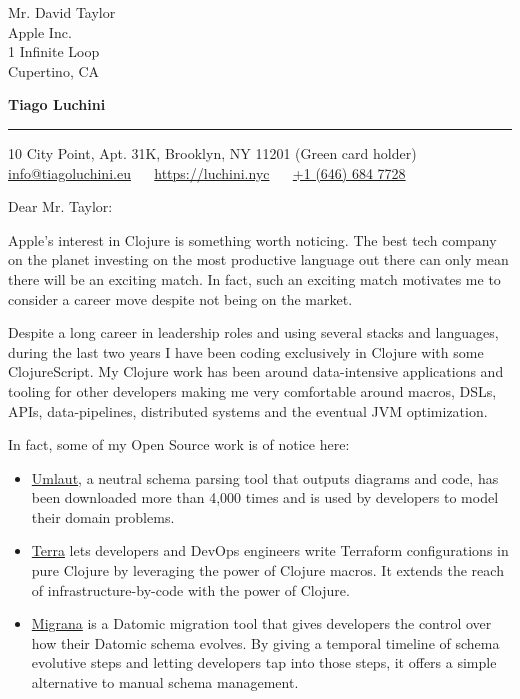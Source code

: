 \documentclass{letter} %
\begin{document}
\signature{Tiago Luchini}                  %
\longindentation=0pt                       %
\let\raggedleft\raggedright                %
 
 
\begin{letter}{Mr. David Taylor \\
Apple Inc. \\
1 Infinite Loop \\
Cupertino, CA}


\begin{flushleft}
{\large\bf Tiago Luchini}
\end{flushleft}
\medskip\hrule
\begin{flushright}
\hfill 10 City Point, Apt. 31K, Brooklyn, NY 11201 (Green card holder)\\ \hfill
\href{mailto:info@tiagoluchini.eu}{info@tiagoluchini.eu} ~~
\href{https://luchini.nyc}{https://luchini.nyc} ~~ \href{tel:+16466847728}{+1
  (646) 684 7728}
\end{flushright}
\vfill %
 
\opening{Dear Mr. Taylor:}


\noindent Apple's interest in Clojure is something worth noticing. The best tech
company on the planet investing on the most productive language out there can
only mean there will be an exciting match. In fact, such an exciting match
motivates me to consider a career move despite not being on the market.

\noindent Despite a long career in leadership roles and using several stacks and
languages, during the last two years I have been coding exclusively in Clojure
with some ClojureScript. My Clojure work has been around data-intensive
applications and tooling for other developers making me very comfortable around
macros, DSLs, APIs, data-pipelines, distributed systems and the eventual JVM
optimization.

\noindent In fact, some of my Open Source work is of notice here:

\begin{itemize}
  \item \href{https://github.com/workco/umlaut}{Umlaut}, a neutral schema
    parsing tool that outputs diagrams and code, has been downloaded more than
    4,000 times and is used by developers to model their domain problems.
  \item \href{https://github.com/luchiniatwork/terra}{Terra} lets developers and
    DevOps engineers write Terraform configurations in pure Clojure by
    leveraging the power of Clojure macros. It extends the reach of
    infrastructure-by-code with the power of Clojure.
  \item \href{https://github.com/luchiniatwork/migrana}{Migrana} is a Datomic
    migration tool that gives developers the control over how their Datomic
    schema evolves. By giving a temporal timeline of schema evolutive steps and
    letting developers tap into those steps, it offers a simple alternative to
    manual schema management.
\end{itemize}


\end{letter}
\end{document}
